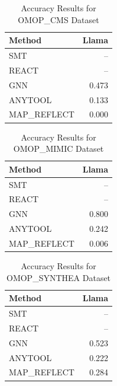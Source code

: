 
\begin{table}[htbp]
\centering
\caption{Accuracy Results for OMOP_CMS Dataset}
\label{tab:omop_cms_accuracy}
\begin{tabular}{lr}
\toprule
\textbf{Method} & \textbf{Llama} \\
\midrule
SMT & -- \\
REACT & -- \\
GNN & 0.473 \\
ANYTOOL & 0.133 \\
MAP_REFLECT & 0.000 \\
\bottomrule
\end{tabular}
\end{table}

\begin{table}[htbp]
\centering
\caption{Accuracy Results for OMOP_MIMIC Dataset}
\label{tab:omop_mimic_accuracy}
\begin{tabular}{lr}
\toprule
\textbf{Method} & \textbf{Llama} \\
\midrule
SMT & -- \\
REACT & -- \\
GNN & 0.800 \\
ANYTOOL & 0.242 \\
MAP_REFLECT & 0.006 \\
\bottomrule
\end{tabular}
\end{table}

\begin{table}[htbp]
\centering
\caption{Accuracy Results for OMOP_SYNTHEA Dataset}
\label{tab:omop_synthea_accuracy}
\begin{tabular}{lr}
\toprule
\textbf{Method} & \textbf{Llama} \\
\midrule
SMT & -- \\
REACT & -- \\
GNN & 0.523 \\
ANYTOOL & 0.222 \\
MAP_REFLECT & 0.284 \\
\bottomrule
\end{tabular}
\end{table}

